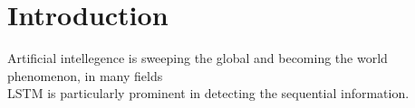 \section{Introduction}
Artificial intellegence is sweeping the global and becoming the world phenomenon, in many fields
\\
LSTM is particularly prominent in detecting the sequential information. 